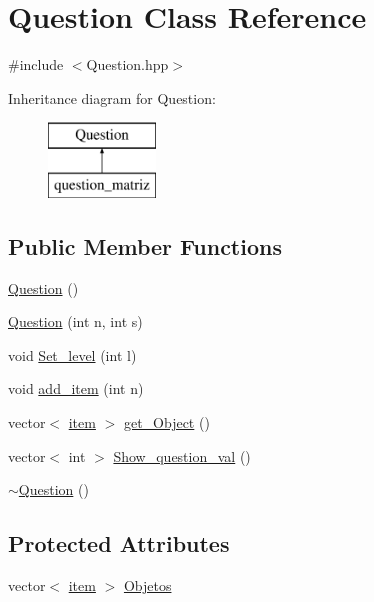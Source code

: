 \hypertarget{class_question}{\section{Question Class Reference}
\label{class_question}
}


{\ttfamily \#include $<$Question.\+hpp$>$}

Inheritance diagram for Question\+:\begin{figure}[H]
\begin{center}
\leavevmode
\includegraphics[height=2.000000cm]{class_question}
\end{center}
\end{figure}
\subsection*{Public Member Functions}
\begin{DoxyCompactItemize}
\item 
\hyperlink{class_question_a2e1167d0407c7530b4f7a7492d0050d0}{Question} ()
\item 
\hyperlink{class_question_a958c203567c631b25004074f478d205b}{Question} (int n, int s)
\item 
void \hyperlink{class_question_a7b457f4106d45132ad45d22ad621f3f9}{Set\+\_\+level} (int l)
\item 
void \hyperlink{class_question_a0bb8e8be70b5ccc72e9918bca35ca35a}{add\+\_\+item} (int n)
\item 
vector$<$ \hyperlink{classitem}{item} $>$ \hyperlink{class_question_afafe6fd5ed376966f808c65749da510a}{get\+\_\+\+Object} ()
\item 
vector$<$ int $>$ \hyperlink{class_question_aa0a8d162db42d785f5050634a4dc9471}{Show\+\_\+question\+\_\+val} ()
\item 
\hyperlink{class_question_a8d9283fb5357e39ed58a743f18629040}{$\sim$\+Question} ()
\end{DoxyCompactItemize}
\subsection*{Protected Attributes}
\begin{DoxyCompactItemize}
\item 
vector$<$ \hyperlink{classitem}{item} $>$ \hyperlink{class_question_aee4dca57403e91e0f2062499ba2955a9}{Objetos}
\end{DoxyCompactItemize}


